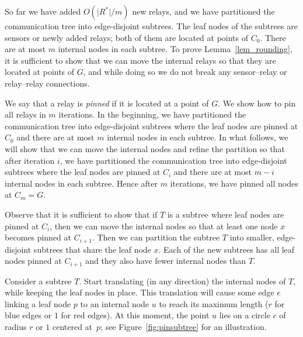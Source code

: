 \documentclass[11pt,a4paper]{article}
\newcommand{\s}[1]{{\lvert #1 \rvert}}
\theoremstyle{definition}
\theoremstyle{remark}
\begin{document}
So far we have added $O(\s{R^*}/m)$ new relays, and we have partitioned the communication tree into edge-disjoint subtrees. The leaf nodes of the subtrees are sensors or newly added relays; both of them are located at points of $C_0$. There are at most $m$ internal nodes in each subtree. To prove Lemma~\ref{lem_rounding}, it is sufficient to show that we can move the internal relays so that they are located at points of $G$, and while doing so we do not break any sensor--relay or relay--relay connections.

We say that a relay is \emph{pinned} if it is located at a point of $G$. We show how to pin all relays in $m$ iterations. In the beginning, we have partitioned the communication tree into edge-disjoint subtrees where the leaf nodes are pinned at $C_0$ and there are at most $m$ internal nodes in each subtree. In what follows, we will show that we can move the internal nodes and refine the partition so that after iteration $i$, we have partitioned the communication tree into edge-disjoint subtrees where the leaf nodes are pinned at $C_i$ and there are at most $m-i$ internal nodes in each subtree. Hence after $m$ iterations, we have pinned all nodes at $C_m = G$.

Observe that it is sufficient to show that if $T$ is a subtree where leaf nodes are pinned at $C_i$, then we can move the internal nodes so that at least one node $x$ becomes pinned at $C_{i+1}$. Then we can partition the subtree $T$ into smaller, edge-disjoint subtrees that share the leaf node $x$. Each of the new subtrees has all leaf nodes pinned at $C_{i+1}$ and they also have fewer internal nodes than $T$.

Consider a subtree $T$. Start translating (in any direction) the internal nodes of $T$, while keeping the leaf nodes in place. This translation will cause some edge $e$ linking a leaf node $p$ to an internal node $u$ to reach its maximum length ($r$ for blue edges or $1$ for red edges). At this moment, the point $u$ lies on a circle $c$ of radius $r$ or $1$ centered at~$p$; see Figure~\ref{fig:pinsubtree} for an illustration.
\end{document}
